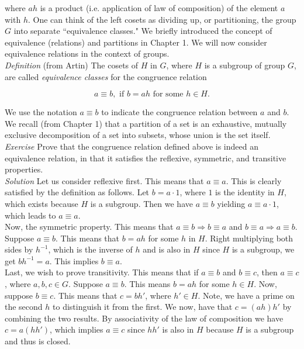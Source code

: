 where $ah$ is a product (i.e. application of law of composition) of the element $a$ with $h$.  One can think of the left cosets as dividing up, or partitioning, the group $G$ into separate ``equivalence classes."  We briefly introduced the concept of equivalence (relations) and partitions in Chapter 1.  We will now consider equivalence relations in the context of groups.\\

\textit{Definition} (from Artin) The cosets of $H$ in $G$, where $H$ is a subgroup of group $G$, are called \textit{equivalence classes} for the congruence relation

\begin{displaymath}
a \equiv b, \text{ if } b=ah \text{ for some } h \in H.
\end{displaymath}

We use the notation $a \equiv b$ to indicate the congruence relation between $a$ and $b$.  We recall (from Chapter 1) that a partition of a set is an exhaustive, mutually exclusive decomposition of a set into subsets, whose union is the set itself.\\

\textit{Exercise} Prove that the congruence relation defined above is indeed an equivalence relation, in that it satisfies the reflexive, symmetric, and transitive properties.\\

\textit{Solution} Let us consider reflexive first.  This means that $a \equiv a$.  This is clearly satisfied by the definition as follows.  Let $b=a \cdot 1$, where $1$ is the identity in $H$, which exists because $H$ is a subgroup.  Then we have $a \equiv b$ yielding $a \equiv a \cdot 1$, which leads to $a \equiv a$.\\

Now, the symmetric property.  This means that $a \equiv b \Longrightarrow b \equiv a$ and $b \equiv a \Longrightarrow a \equiv b$.  Suppose $a \equiv b$.  This means that $b=ah$ for some $h$ in $H$.  Right multiplying both sides by $h^{-1}$, which is the inverse of $h$ and is also in $H$ since $H$ is a subgroup, we get $bh^{-1}=a$.  This implies $b \equiv a$.\\

Last, we wish to prove transitivity.  This means that if $a \equiv b$ and $b \equiv c$, then $a \equiv c$, where $a,b,c \in G$.  Suppose $a \equiv b$.  This means $b=ah$ for some $h \in H$.  Now, suppose $b \equiv c$.  This means that $c=bh'$, where $h' \in H$.  Note, we have a prime on the second $h$ to distinguish it from the first.  We now, have that $c=(ah)h'$ by combining the two results.  By associativity of the law of composition we have $c=a(hh')$, which implies $a \equiv c$ since $hh'$ is also in $H$ because $H$ is a subgroup and thus is closed.\\

